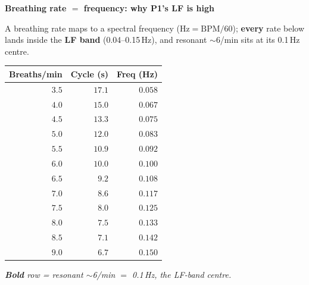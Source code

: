 \documentclass[fontsize=9pt]{scrartcl}
\renewcommand{\arraystretch}{1.35}
\newlength{\panelB}\setlength{\panelB}{100mm}
\newcommand{\ctitle}[2][jcgreen]{{\color{#1}\bfseries\large #2}\par\vspace{1.6mm}}
\begin{document}
\begin{minipage}[t][210mm][t]{\panelB}
\begin{tcolorbox}[panel,colback=jcindigo,width=\panelB,height=210mm,fontupper=\color{white}]
  \begin{tcolorbox}[card, borderline west={2.2mm}{0mm}{jublue}]
    \ctitle[jublue]{Breathing rate $=$ frequency: why P1's LF is high}
    {\color{inkdark}\footnotesize
     A breathing rate maps to a spectral frequency ($\mathrm{Hz}=\mathrm{BPM}/60$);
     \textbf{every} rate below lands inside the \textbf{LF band} (0.04--0.15\,Hz),
     and resonant $\sim$6/min sits at its 0.1\,Hz centre.\par}
    \vspace{1.6mm}
    {\color{inkdark}\footnotesize
    \renewcommand{\arraystretch}{1.05}\setlength{\tabcolsep}{5pt}%
    \begin{tabular}{@{}r r r@{}}
      \textbf{Breaths/min} & \textbf{Cycle (s)} & \textbf{Freq (Hz)}\\
      \hline
      $3.5$ & $17.1$ & $0.058$\\
      $4.0$ & $15.0$ & $0.067$\\
      $4.5$ & $13.3$ & $0.075$\\
      $5.0$ & $12.0$ & $0.083$\\
      $5.5$ & $10.9$ & $0.092$\\
      $\mathbf{6.0}$ & $\mathbf{10.0}$ & $\mathbf{0.100}$\\
      $6.5$ & $9.2$ & $0.108$\\
      $7.0$ & $8.6$ & $0.117$\\
      $7.5$ & $8.0$ & $0.125$\\
      $8.0$ & $7.5$ & $0.133$\\
      $8.5$ & $7.1$ & $0.142$\\
      $9.0$ & $6.7$ & $0.150$\\
    \end{tabular}\par}
    \vspace{1.4mm}
    {\footnotesize\color{jublue}\itshape \textbf{Bold} row = resonant $\sim$6/min
     $=$ 0.1\,Hz, the LF-band centre.\par}
  \end{tcolorbox}
\end{tcolorbox}%
\end{minipage}%
\end{document}
